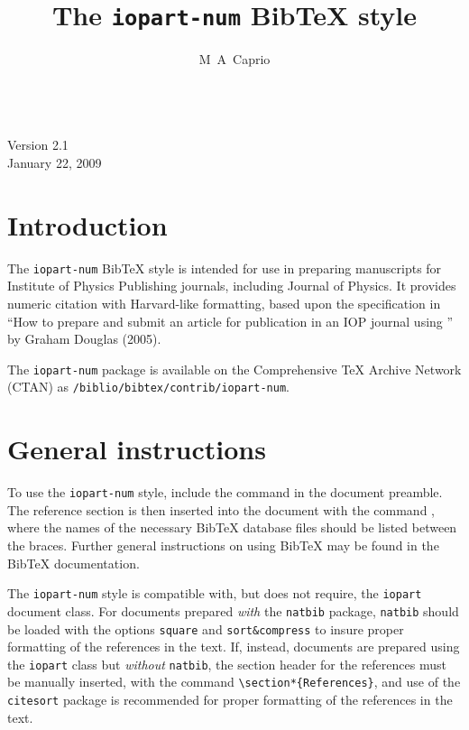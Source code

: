 \documentclass[12pt]{iopart}
\newcommand{\BibTeX}{Bib\TeX}
\begin{document}
\nocite{*}

\title{The \texttt{iopart-num} \BibTeX{} style}

\noindent \qquad \\[-6pt] \qquad Version 2.1\\\qquad January 22, 2009

\author{M~A~Caprio}

\address{Department of Physics, University of Notre Dame,
Notre Dame, Indiana 46556-5670, USA}

\section{Introduction}

The \texttt{iopart-num} \BibTeX{} style is intended for use in
preparing manuscripts for Institute of Physics Publishing journals,
including Journal of Physics.  It provides numeric citation with
Harvard-like formatting, based upon the specification in ``How to
prepare and submit an article for publication in an IOP journal using
\LaTeXe'' by Graham Douglas (2005).

The \texttt{iopart-num} package is available on the Comprehensive
\TeX{} Archive Network (CTAN) as \texttt{/biblio/bibtex/contrib/iopart-num}.

\section{General instructions}

To use the \texttt{iopart-num} style, include the command
\verb++ in the
document preamble.  The reference section is then inserted into the
document with the command \verb++, where the names
of the necessary \BibTeX{} database files should be listed between the
braces.  Further general instructions on using \BibTeX{} may be found
in the \BibTeX{} documentation.

The \texttt{iopart-num} style is compatible with, but does not
require, the \texttt{iopart} document class.
For documents prepared \textit{with}
the \texttt{natbib} package, 
\texttt{natbib} should be loaded with the options \verb+square+ and \verb+sort&compress+
to insure proper formatting of the references in the text.  If,
instead, 
documents are prepared using the \texttt{iopart} class but
\textit{without} \texttt{natbib}, the section header 
for the references must be manually inserted, with the command
\verb+\section*{References}+, and use of the \texttt{citesort} package
is recommended for proper formatting of the references in the text.
\end{document}
